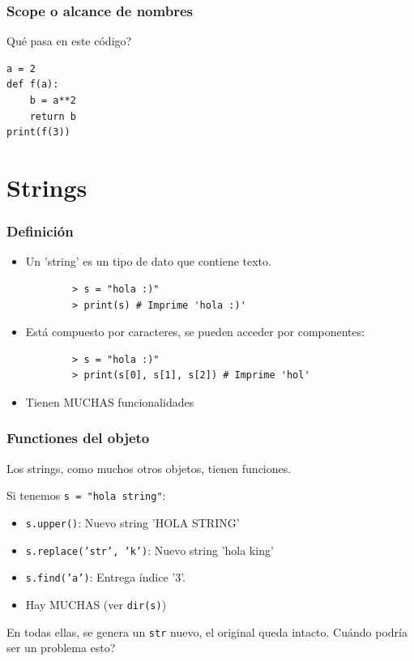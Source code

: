 \documentclass[14pt,aspectratio=169,xcolor=dvipsnames]{beamer}
\begin{document}
\begin{frame}[fragile]\frametitle{Scope o alcance de nombres}
Qué pasa en este código?

\begin{verbatim}
a = 2
def f(a):
    b = a**2
    return b
print(f(3))
\end{verbatim}

\end{frame}
\section{Strings}
\begin{frame}[t,fragile]\frametitle{Definición}
    \begin{itemize} 
        \item<1-> Un 'string' es un tipo de dato que contiene texto. 
            \begin{verbatim}
        > s = "hola :)"
        > print(s) # Imprime 'hola :)'
            \end{verbatim}
        \item<2-> Está compuesto por caracteres, se pueden acceder por componentes: 
            \begin{verbatim}
        > s = "hola :)"
        > print(s[0], s[1], s[2]) # Imprime 'hol'
            \end{verbatim}
        \item<3-> Tienen MUCHAS funcionalidades
    \end{itemize}
\end{frame}
\begin{frame}\frametitle{Functiones del objeto}
    Los strings, como muchos otros objetos, tienen funciones. 

    Si tenemos \texttt{s = "hola string"}:
    \begin{itemize}
        \item \texttt{s.upper()}: Nuevo string 'HOLA STRING'
        \item \texttt{s.replace('str', 'k')}: Nuevo string 'hola king'
        \item \texttt{s.find('a')}: Entrega índice '3'.
        \item Hay MUCHAS (ver \texttt{dir(s)})
    \end{itemize}

En todas ellas, se genera un \texttt{str} nuevo, el original queda intacto. Cuándo podría ser un problema esto? 
\end{frame}
\end{document}

